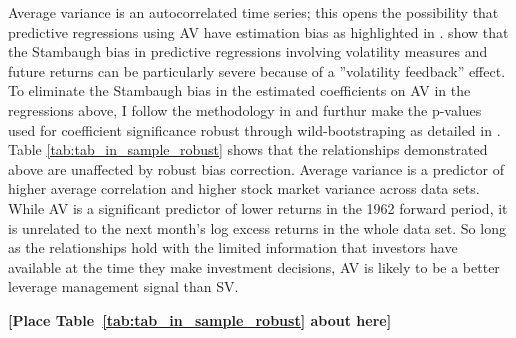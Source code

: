 Average variance is an autocorrelated time series; this opens the possibility that predictive regressions using AV have estimation bias as highlighted in \citet{stambaugh_predictive_1999}. \citet{campbell_no_1992} show that the Stambaugh bias in predictive regressions involving volatility measures and future returns can be particularly severe because of a ”volatility feedback” effect. To eliminate the Stambaugh bias in the estimated coefficients on AV in the regressions above, I follow the methodology in \citet{Amihud2004} and furthur make the p-values used for coefficient significance robust through wild-bootstraping as detailed in \citet{mackinnon_bootstrap_2002}. Table \ref{tab:tab_in_sample_robust} shows that the relationships demonstrated above are unaffected by robust bias correction. Average variance is a predictor of higher average correlation and higher stock market variance across data sets. While AV is a significant predictor of lower returns in the 1962 forward period, it is unrelated to the next month’s log excess returns in the whole data set. So long as the relationships hold with the limited information that investors have available at the time they make investment decisions, AV is likely to be a better leverage management signal than SV.
\bigskip
\centerline{\bf [Place Table~\ref{tab:tab_in_sample_robust} about here]}
\bigskip